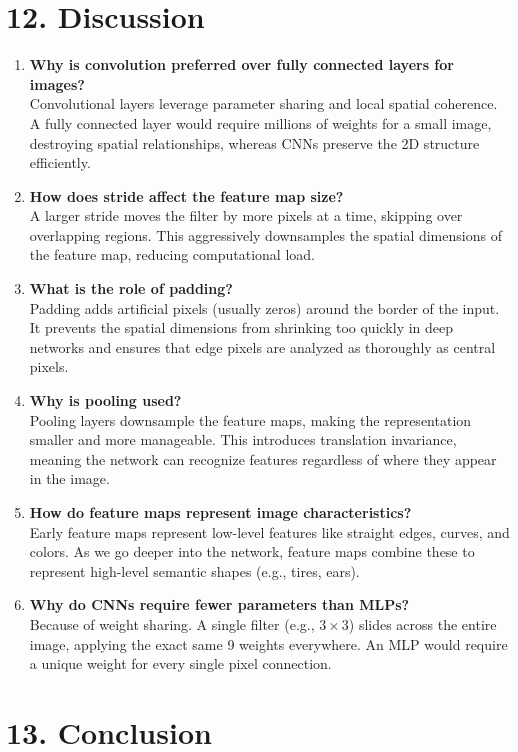 \documentclass[11pt]{article}
\begin{document}
\section*{12. Discussion}

\begin{enumerate}
\item \textbf{Why is convolution preferred over fully connected layers for images?}\\
Convolutional layers leverage parameter sharing and local spatial coherence. A fully connected layer would require millions of weights for a small image, destroying spatial relationships, whereas CNNs preserve the 2D structure efficiently.
\item \textbf{How does stride affect the feature map size?}\\
A larger stride moves the filter by more pixels at a time, skipping over overlapping regions. This aggressively downsamples the spatial dimensions of the feature map, reducing computational load.
\item \textbf{What is the role of padding?}\\
Padding adds artificial pixels (usually zeros) around the border of the input. It prevents the spatial dimensions from shrinking too quickly in deep networks and ensures that edge pixels are analyzed as thoroughly as central pixels.
\item \textbf{Why is pooling used?}\\
Pooling layers downsample the feature maps, making the representation smaller and more manageable. This introduces translation invariance, meaning the network can recognize features regardless of where they appear in the image.
\item \textbf{How do feature maps represent image characteristics?}\\
Early feature maps represent low-level features like straight edges, curves, and colors. As we go deeper into the network, feature maps combine these to represent high-level semantic shapes (e.g., tires, ears).
\item \textbf{Why do CNNs require fewer parameters than MLPs?}\\
Because of weight sharing. A single filter (e.g., $3\times3$) slides across the entire image, applying the exact same 9 weights everywhere. An MLP would require a unique weight for every single pixel connection.
\end{enumerate}

\section*{13. Conclusion}
\end{document}

